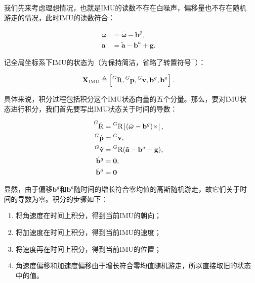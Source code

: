 我们先来考虑理想情况，也就是IMU的读数不存在白噪声，偏移量也不存在随机游走的情况，此时IMU的读数符合：

\begin{equation}
\begin{aligned}
    \bm\omega  &= \tilde{\bm\omega} - \mathbf{b}^g, \\
    \mathbf{a} &= \tilde{\mathbf a} - \mathbf{b}^a + \mathbf{g}.
\end{aligned}
\end{equation}

记全局坐标系下IMU的状态为（为保持简洁，省略了转置符号${}^\top$）：

\begin{equation}
  \mathbf{X}_{\textrm{IMU}} \triangleq
  \left[
      \prescript{G}{}{\mathrm R},
      \prescript{G}{}{\mathbf p},
      \prescript{G}{}{\mathbf v},
      \mathbf{b}^g, \mathbf{b}^a
  \right].
\end{equation}

具体来说，积分过程包括积分这个IMU状态向量的五个分量。那么，要对IMU状态进行积分，我们首先要写出IMU状态关于时间的导数：

\begin{equation}
\begin{aligned}
    \prescript{G}{}{\dot{\mathrm R}}
        &= \prescript{G}{}{\mathrm R} \lfloor(\tilde{\bm\omega} - \mathbf{b}^g)\times\rfloor, \\
    \prescript{G}{}{\dot{\mathbf p}}
        &= \prescript{G}{}{\mathbf v}, \\
    \prescript{G}{}{\dot{\mathbf v}}
        &= \prescript{G}{}{\mathrm R} (\tilde{\mathbf a} - \mathbf{b}^a + \mathbf{g}), \\
    \dot{\mathbf b}^g &= \mathbf{0}, \\
    \dot{\mathbf b}^a &= \mathbf{0}
\end{aligned}
\end{equation}

显然，由于偏移$\mathbf{b}^g$和$\mathbf{b}^a$随时间的增长符合零均值的高斯随机游走，故它们关于时间的导数为零。积分的步骤如下：

\begin{enumerate}
    \item 将角速度在时间上积分，得到当前IMU的朝向；
    \item 将加速度在时间上积分，得到当前IMU的速度；
    \item 将速度再在时间上积分，得到当前IMU的位置；
    \item 角速度偏移和加速度偏移由于增长符合零均值随机游走，所以直接取旧的状态中的值。
\end{enumerate}

